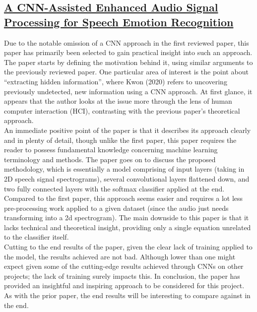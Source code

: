 \documentclass[12pt]{article}
\begin{document}
\subsection{\href{https://www.mdpi.com/1424-8220/20/1/183/pdf}{A CNN-Assisted Enhanced Audio Signal Processing for Speech Emotion Recognition}}
Due to the notable omission of a CNN approach in the first reviewed paper, this paper has primarily been selected to gain practical insight into such an approach. The paper starts by defining the motivation behind it, using similar arguments to the previously reviewed paper. One particular area of interest is the point about ``extracting hidden information'', where Kwon (2020) refers to uncovering previously undetected, new information using a CNN approach. At first glance, it appears that the author looks at the issue more through the lens of human computer interaction (HCI), contrasting with the previous paper's theoretical approach.
\\

\noindent An immediate positive point of the paper is that it describes its approach clearly and in plenty of detail, though unlike the first paper, this paper requires the reader to possess fundamental knowledge concerning machine learning terminology and methods. The paper goes on to discuss the proposed methodology, which is essentially a model comprising of input layers (taking in 2D speech signal spectrograms), several convolutional layers flattened down, and two fully connected layers with the softmax classifier applied at the end. Compared to the first paper, this approach seems easier and requires a lot less pre-processing work applied to a given dataset (since the audio just needs transforming into a 2d spectrogram). The main downside to this paper is that it lacks technical and theoretical insight, providing only a single equation unrelated to the classifier itself.
\\

\noindent Cutting to the end results of the paper, given the clear lack of training applied to the model, the results achieved are not bad. Although lower than one might expect given some of the cutting-edge results achieved through CNNs on other projects; the lack of training surely impacts this. In conclusion, the paper has provided an insightful and inspiring approach to be considered for this project. As with the prior paper, the end results will be interesting to compare against in the end.
\end{document}
